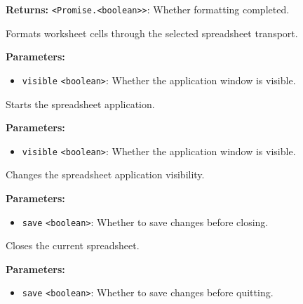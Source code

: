 \documentclass[12pt,a4paper]{article}
\begin{document}
\noindent \textbf{Returns:} \texttt{<Promise.<boolean>>}: Whether formatting completed.

\noindent Formats worksheet cells through the selected spreadsheet transport.

\vspace{5mm}
\noindent {}


\noindent \textbf{Parameters:}
\begin{itemize}
  \item \texttt{visible} \texttt{<boolean>}: Whether the application window is visible.
\end{itemize}

\noindent Starts the spreadsheet application.

\vspace{5mm}
\noindent {}


\noindent \textbf{Parameters:}
\begin{itemize}
  \item \texttt{visible} \texttt{<boolean>}: Whether the application window is visible.
\end{itemize}

\noindent Changes the spreadsheet application visibility.

\vspace{5mm}
\noindent {}


\noindent \textbf{Parameters:}
\begin{itemize}
  \item \texttt{save} \texttt{<boolean>}: Whether to save changes before closing.
\end{itemize}

\noindent Closes the current spreadsheet.

\vspace{5mm}
\noindent {}


\noindent \textbf{Parameters:}
\begin{itemize}
  \item \texttt{save} \texttt{<boolean>}: Whether to save changes before quitting.
\end{itemize}
\end{document}
